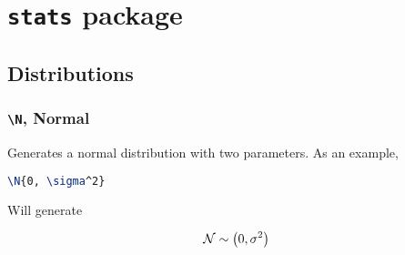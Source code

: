 \documentclass[]{article}
\title{}
\author{}
\begin{document}
\maketitle

\begin{abstract}

\end{abstract}

\section{\texttt{stats} package}

\subsection{Distributions}

\subsubsection{\texttt{\textbackslash N}, Normal}

Generates a normal distribution with two parameters.
As an example,

\begin{lstlisting}[language=TeX]
\N{0, \sigma^2}
\end{lstlisting}

Will generate

\[ \mathcal{N} \sim \left( 0,\sigma^2 \right) \]
\end{document}
